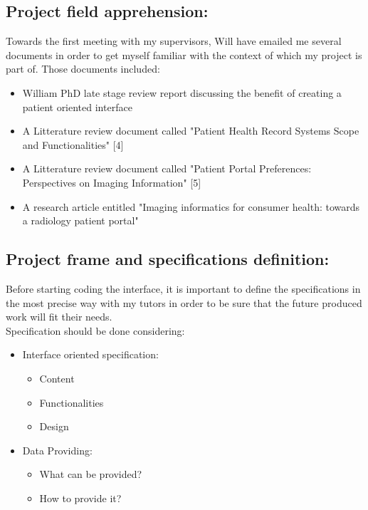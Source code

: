 \documentclass[12pt,twoside]{article}
\begin{document}
\subsection{Project field apprehension:} 
Towards the first meeting with my supervisors, Will have emailed me several documents in order to get myself familiar with the context of which my project is part of.
Those documents included:
\begin{itemize}
\item William PhD late stage review report discussing the benefit of creating a patient oriented interface
\item A Litterature review document called "Patient Health Record Systems Scope and Functionalities" [4]
\item A Litterature review document called "Patient Portal Preferences: Perspectives on Imaging Information" [5]
\item A research article entitled "Imaging informatics for consumer health: towards a radiology patient portal"
\end{itemize}
 
\subsection{Project frame and specifications definition:}
Before starting coding the interface, it is important to define the specifications in the most precise way with my tutors in order to be sure that the future produced work will fit their needs. \\
Specification should be done considering:
\begin{itemize}
\item Interface oriented specification:
\begin{itemize}
\item Content
\item Functionalities
\item Design
\end{itemize}

\item Data Providing:
\begin{itemize} 
\item What can be provided?
\item How to provide it?
\end{itemize}

	
\end{itemize}

\clearpage
\end{document}
